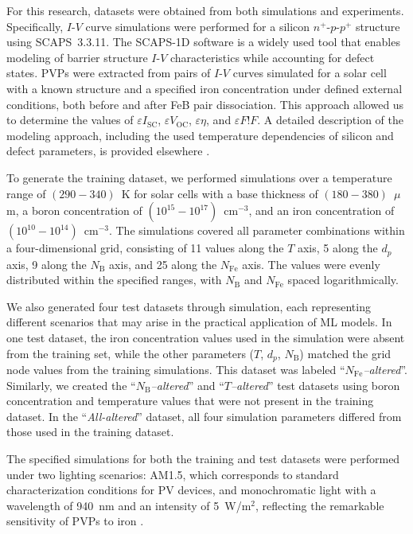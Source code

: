 \documentclass[a4paper,fleqn]{cas-sc}
\begin{document}
For this research, datasets were obtained from both simulations and experiments.
Specifically, $I$-$V$ curve simulations were performed for a silicon $n^+$-$p$-$p^+$ structure using SCAPS~3.3.11.
The SCAPS-1D software \cite{SCAPS1} is a widely used tool
\cite{MasumMia2025, Joshi2024, Ravidas2024, Liu2024, You2023, SCAPSDefect3} 
that enables modeling of barrier structure $I$-$V$ characteristics while accounting for defect states.
PVPs were extracted from pairs of $I$-$V$ curves simulated for a solar cell with a known structure 
and a specified iron concentration under defined external conditions, both before and after FeB pair dissociation.
This approach allowed us to determine the values of $\varepsilon I_\mathrm{SC}$, $\varepsilon V_\mathrm{OC}$, $\varepsilon \eta$, and $\varepsilon F!F$.
A detailed description of the modeling approach, including the used temperature dependencies of silicon and defect parameters, 
is provided elsewhere \cite{Olikh2019SM, Olikh2025MSEB}.


To generate the training dataset, we performed simulations over a temperature range of $(290-340)$~K
for solar cells with a base thickness of $(180-380)$~$\mu$m, 
a boron concentration of $(10^{15} - 10^{17})$~cm$^{-3}$, and an iron concentration of $(10^{10}-10^{14})$~cm$^{-3}$.
The simulations covered all parameter combinations within a four-dimensional grid, consisting of 11 values along the $T$ axis,
5 along the $d_p$ axis,
9 along the $N_\mathrm{B}$ axis, and 25 along the $N_\mathrm{Fe}$ axis.
The values were evenly distributed within the specified ranges, with $N_\mathrm{B}$ and $N_\mathrm{Fe}$ spaced logarithmically.

We also generated four test datasets through simulation, 
each representing different scenarios that may arise in the practical application of ML models.
In one test dataset, the iron concentration values used in the simulation were absent from the training set, 
while the other parameters ($T$, $d_p$, $N_\mathrm{B}$) matched the grid node values from the training simulations. 
This dataset was labeled ``\textit{$N_\mathrm{Fe}$--altered}''.
Similarly, we created the ``\textit{$N_\mathrm{B}$--altered}'' and ``\textit{$T$--altered}'' test datasets using boron concentration and temperature values that were not present in the training dataset.
In the ``\textit{All-altered}'' dataset, all four simulation parameters differed from those used in the training dataset.


The specified simulations for both the training and test datasets were performed under two lighting scenarios: 
AM1.5, which corresponds to standard characterization conditions for PV devices, 
and monochromatic light with a wavelength of 940~nm and an intensity of 5~W/m$^{2}$, 
reflecting the remarkable sensitivity of PVPs to iron \cite{Olikh2025MSEB}.
\end{document}
